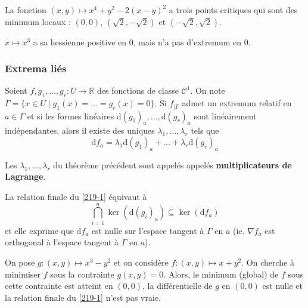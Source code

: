   \begin{example}
    La fonction $(x,y) \mapsto x^4 + y^2 - 2(x-y)^2$ a trois points critiques qui sont des minimum locaux : $(0,0)$, $(\sqrt{2},-\sqrt{2})$ et $(-\sqrt{2},\sqrt{2})$.
  \end{example}

  \begin{cexample}
    $x \mapsto x^3$ a sa hessienne positive en $0$, mais n'a pas d'extremum en $0$.
  \end{cexample}

  \subsubsection{Extrema liés}


  \begin{theorem}
    \label{219-1}
    Soient $f, g_1, \dots, g_r : U \rightarrow \mathbb{R}$ des fonctions de classe $\mathcal{C}^1$. On note $\Gamma = \{ x \in U \mid g_1(x) = \dots = g_r(x) = 0 \}$. Si $f_{|\Gamma}$ admet un extremum relatif en $a \in \Gamma$ et si les formes linéaires $\mathrm{d}(g_1)_a, \dots, \mathrm{d}(g_r)_a$ sont linéairement indépendantes, alors il existe des uniques $\lambda_1, \dots, \lambda_r$ tels que
    \[ \mathrm{d}f_a = \lambda_1 \mathrm{d}(g_1)_a + \dots + \lambda_r \mathrm{d}(g_r)_a \]
  \end{theorem}

  \begin{definition}
    Les $\lambda_1, \dots, \lambda_r$ du théorème précédent sont appelés appelés \textbf{multiplicateurs de Lagrange}.
  \end{definition}


  \begin{remark}
    La relation finale du \cref{219-1} équivaut à
    \[ \bigcap_{i=1}^n \ker(\mathrm{d}(g_i)_a) \subseteq \ker(\mathrm{d}f_a) \]
    et elle exprime que $\mathrm{d}f_a$ est nulle sur l'espace tangent à $\Gamma$ en $a$ (ie. $\nabla f_a$ est orthogonal à l'espace tangent à $\Gamma$ en $a$).
  \end{remark}

  \begin{cexample}
    On pose $g : (x,y) \mapsto x^3-y^2$ et on considère $f : (x, y) \mapsto x+y^2$. On cherche à minimiser $f$ sous la contrainte $g(x,y) = 0$.
    \newpar
    Alors, le minimum (global) de $f$ sous cette contrainte est atteint en $(0,0)$, la différentielle de $g$ en $(0,0)$ est nulle et la relation finale du \cref{219-1} n'est pas vraie.
  \end{cexample}

